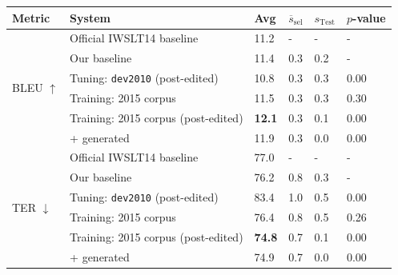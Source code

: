 {%

\begin{table}[htb]
\begin{center}
\begin{tabular}{|l|l|l|l|l|l|}
\hline
\bf Metric & \bf System & \bf Avg & \bf $\overline{s}_{\text{sel}}$ & \bf $s_{\text{Test}}$ & \bf $p$-value \\
\hline
\multirow{6}{*}{BLEU $\uparrow$}
& Official IWSLT14 baseline  & 11.2 & -   & -   & - \\
& Our baseline & 11.4 & 0.3 & 0.2 & - \\
& Tuning: {\small \tt dev2010} (post-edited) & 10.8 & 0.3 & 0.3 & 0.00 \\
& Training: 2015 corpus & 11.5 & 0.3 & 0.3 & 0.30 \\
& Training: 2015 corpus (post-edited) & \textbf{12.1} & 0.3 & 0.1 & 0.00 \\
& + generated & 11.9 & 0.3 & 0.0 & 0.00 \\ 
\hline
\multirow{6}{*}{TER $\downarrow$}
& Official IWSLT14 baseline & 77.0 & -   & -   & - \\
& Our baseline & 76.2 & 0.8 & 0.3 & - \\
& Tuning: {\small \tt dev2010} (post-edited) & 83.4 & 1.0 & 0.5 & 0.00 \\
& Training: 2015 corpus & 76.4 & 0.8 & 0.5 & 0.26 \\
& Training: 2015 corpus (post-edited) & \textbf{74.8} & 0.7 & 0.1 & 0.00 \\
& + generated & 74.9 & 0.7 & 0.0 & 0.00 \\ 
\hline
\end{tabular}
\end{center}


\end{table}}
